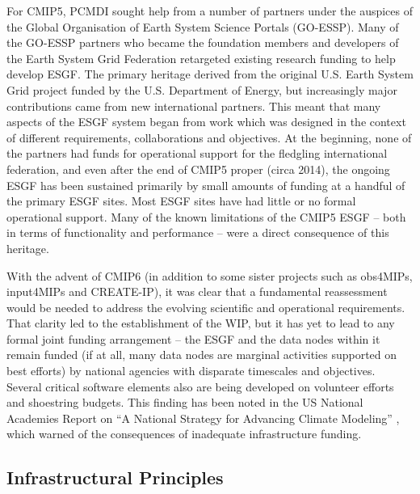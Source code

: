 \documentclass[gmd,manuscript]{copernicus}
\begin{document}
For CMIP5, PCMDI sought help from a number of partners under the
auspices of the Global Organisation of Earth System Science Portals
(GO-ESSP). Many of the GO-ESSP partners who became the foundation
members and developers of the Earth System Grid Federation retargeted
existing research funding to help develop ESGF. The primary heritage derived from
the original U.S. Earth System Grid project funded by
the U.S. Department of Energy, but increasingly major contributions 
came from new international partners. This meant that many
aspects of the ESGF system began from work which was designed in the
context of different requirements, collaborations and objectives. At
the beginning, none of the partners had funds for operational support
for the fledgling international federation, and even after the end of
CMIP5 proper (circa 2014), the ongoing ESGF has been sustained primarily by small
amounts of funding at a handful of the primary ESGF sites. Most ESGF sites
have had little or no formal operational support. Many of the known
limitations of the CMIP5 ESGF -- both in terms of functionality and
performance -- were a direct consequence of this heritage.

With the advent of CMIP6 (in addition to some sister projects such as
obs4MIPs, input4MIPs and CREATE-IP), it was clear that
a fundamental reassessment would be needed to address the evolving
scientific and operational requirements. That clarity led to the
establishment of the WIP, but it has yet to lead to any formal joint
funding arrangement -- the ESGF and the data nodes within it remain
funded (if at all, many data nodes are marginal activities supported
on best efforts) by national agencies with disparate timescales and
objectives. Several critical software elements also are being
developed on volunteer efforts and shoestring budgets. This finding
has been noted in the US National Academies Report on ``A National
Strategy for Advancing Climate Modeling'' \citep{ref:nasem2012}, which
warned of the consequences of inadequate infrastructure funding.

\subsection{Infrastructural Principles}
\label{sec:infra-principles}
\end{document}

